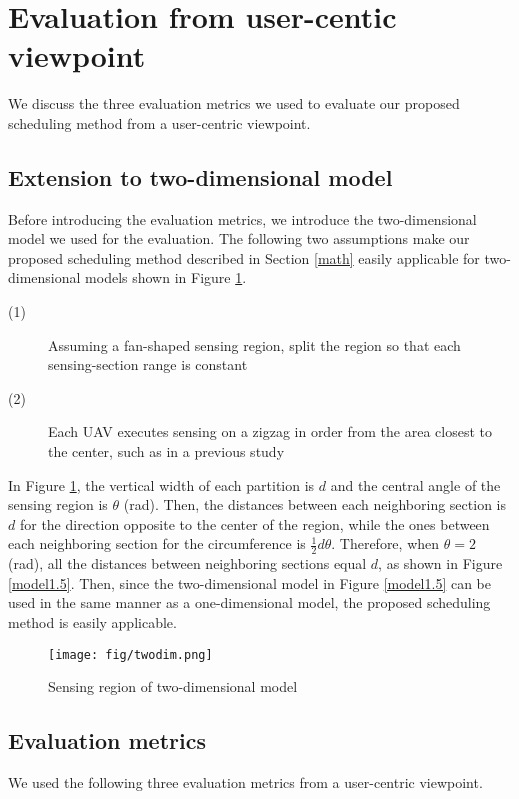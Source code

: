 \documentclass{ieeeaccess}
\begin{document}
\section{Evaluation from user-centic viewpoint}
We discuss the three evaluation metrics we used to evaluate our proposed scheduling method from a user-centric viewpoint.

\subsection{Extension to two-dimensional model}\label{twodi}
Before introducing the evaluation metrics, we introduce the two-dimensional model we used for the evaluation.
The following two assumptions make our proposed scheduling method described in Section \ref{math} easily applicable for two-dimensional models shown in Figure \ref{twodimention}.

\begin{description}

\item[(1)]  Assuming a fan-shaped sensing region, split the region so that each sensing-section range is constant
\item[(2)] Each UAV executes sensing on a zigzag in order from the area closest to the center, such as in a previous study \cite{Maza2007}
\end{description}

In Figure \ref{twodimention}, the vertical width of each partition is $d$ and the central angle of the sensing region is $\theta$ (rad).
Then, the distances between each neighboring section is $d$ for the direction opposite to the center of the region, while the ones between each neighboring section for the circumference is $\frac{1}{2}d\theta$.
Therefore, when $\theta=2$ (rad), all the distances between neighboring sections equal $d$, as shown in Figure \ref{model1.5}. Then, since the two-dimensional model in Figure \ref{model1.5} can be used in the  same manner as a one-dimensional model, the proposed scheduling method is easily applicable.
\begin{figure}[t]
\begin{center}
\texttt{[image: fig/twodim.png]}
\caption{Sensing region of two-dimensional model}
\label{twodimention}
\end{center}
\end{figure}

\subsection{Evaluation metrics}\label{compare}
We used the following three evaluation metrics from a user-centric viewpoint.
\end{document}
